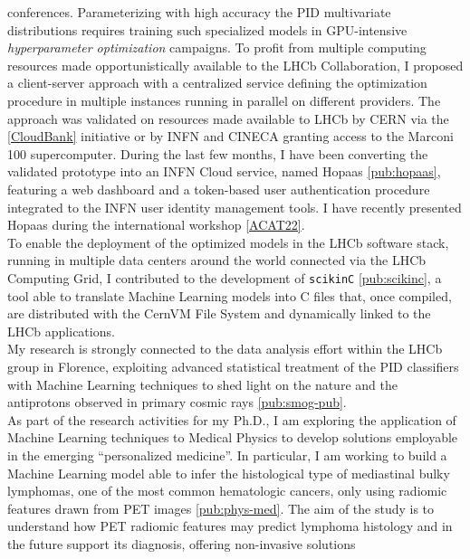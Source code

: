 \begin{cvcontent}
  conferences. Parameterizing with high accuracy the PID multivariate 
  distributions requires training such specialized models
  in GPU-intensive \emph{hyperparameter optimization} campaigns.
  To profit from multiple computing resources made opportunistically
  available to the LHCb Collaboration, I proposed a client-server
  approach with a centralized service defining the optimization
  procedure in multiple instances running in parallel on different 
  providers. The approach was validated on resources made available 
  to LHCb by CERN via the \hyperlink{cloud-bank}{[CloudBank]} initiative
  or by INFN and CINECA granting access to the Marconi 100 supercomputer. 
  During the last few months, I have been converting the validated 
  prototype into an INFN Cloud service, named Hopaas \ref{pub:hopaas}, 
  featuring a web dashboard and a token-based user authentication 
  procedure integrated to the INFN user identity management tools.
  I have recently presented Hopaas during the international workshop 
  \hyperlink{acat-2022}{[ACAT22]}.
  \\ [1.5mm]
  To enable the deployment of the optimized models in the LHCb software 
  stack, running in multiple data centers around the world connected 
  via the LHCb Computing Grid, I contributed to the development of 
  \texttt{scikinC} \ref{pub:scikinc}, a tool able to translate 
  Machine Learning models into C files that, once compiled, 
  are distributed with the CernVM File System and dynamically 
  linked to the LHCb applications.
  \\ [1.5mm]
  My research is strongly connected to the data analysis effort within 
  the LHCb group in Florence, exploiting advanced statistical treatment 
  of the PID classifiers with Machine Learning techniques to shed light 
  on the nature and the antiprotons observed in primary cosmic rays 
  \ref{pub:smog-pub}.
  \\ [1.5mm]
  As part of the research activities for my Ph.D., I am exploring the 
  application of Machine Learning techniques to Medical Physics to 
  develop solutions employable in the emerging ``personalized medicine''. 
  In particular, I am working to build a Machine Learning model able 
  to infer the histological type of mediastinal bulky lymphomas, one 
  of the most common hematologic cancers, only using radiomic features 
  drawn from PET images \ref{pub:phys-med}. The aim of the study is to 
  understand how PET radiomic features may predict lymphoma histology 
  and in the future support its diagnosis, offering non-invasive solutions 

\end{cvcontent}
